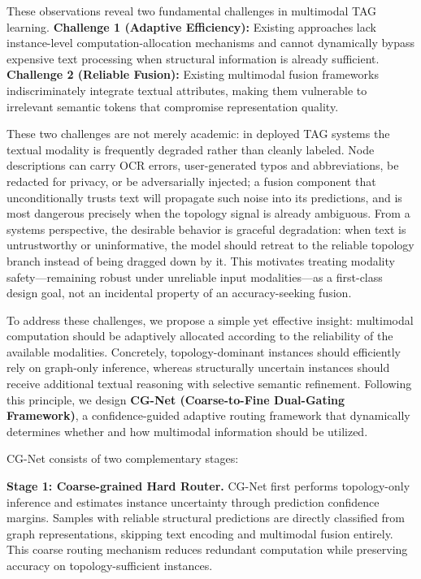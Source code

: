 \documentclass[preprint,12pt,authoryear]{elsarticle}
\begin{document}
These observations reveal two fundamental challenges in multimodal TAG learning.
\textbf{Challenge 1 (Adaptive Efficiency):} Existing approaches lack instance-level computation-allocation mechanisms and cannot dynamically bypass expensive text processing when structural information is already sufficient.
\textbf{Challenge 2 (Reliable Fusion):} Existing multimodal fusion frameworks indiscriminately integrate textual attributes, making them vulnerable to irrelevant semantic tokens that compromise representation quality.

These two challenges are not merely academic: in deployed TAG systems the textual modality is frequently degraded rather than cleanly labeled. Node descriptions can carry OCR errors, user-generated typos and abbreviations, be redacted for privacy, or be adversarially injected; a fusion component that unconditionally trusts text will propagate such noise into its predictions, and is most dangerous precisely when the topology signal is already ambiguous. From a systems perspective, the desirable behavior is graceful degradation: when text is untrustworthy or uninformative, the model should retreat to the reliable topology branch instead of being dragged down by it. This motivates treating modality safety---remaining robust under unreliable input modalities---as a first-class design goal, not an incidental property of an accuracy-seeking fusion.

To address these challenges, we propose a simple yet effective insight: multimodal computation should be adaptively allocated according to the reliability of the available modalities. Concretely, topology-dominant instances should efficiently rely on graph-only inference, whereas structurally uncertain instances should receive additional textual reasoning with selective semantic refinement. Following this principle, we design \textbf{CG-Net (Coarse-to-Fine Dual-Gating Framework)}, a confidence-guided adaptive routing framework that dynamically determines whether and how multimodal information should be utilized.

CG-Net consists of two complementary stages:

\noindent\textbf{Stage 1: Coarse-grained Hard Router.}
CG-Net first performs topology-only inference and estimates instance uncertainty through prediction confidence margins. Samples with reliable structural predictions are directly classified from graph representations, skipping text encoding and multimodal fusion entirely. This coarse routing mechanism reduces redundant computation while preserving accuracy on topology-sufficient instances.
\end{document}
